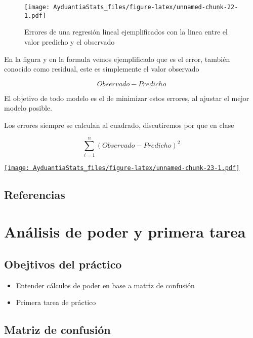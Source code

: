 \documentclass[]{book}
\providecommand{\tightlist}{%
  \setlength{\itemsep}{0pt}\setlength{\parskip}{0pt}}
\begin{document}
\begin{figure}
\centering
\texttt{[image: AyduantiaStats\_files/figure-latex/unnamed-chunk-22-1.pdf]}
\caption{\label{fig:unnamed-chunk-22}Errores de una regresión lineal ejemplificados con la linea entre el valor predicho y el observado}
\end{figure}

En la figura y en la formula vemos ejemplificado que es el error, también conocido como residual, este es simplemente el valor observado

\[Observado - Predicho\]

El objetivo de todo modelo es el de minimizar estos errores, al ajustar el mejor modelo posible.

Los errores siempre se calculan al cuadrado, discutiremos por que en clase

\[\sum_{i=1}^{n} (Observado - Predicho)^2\]

\href{http://admin.derek-corcoran-barrios.com/shiny/rstudio/sample-apps/Shiny1/}{\texttt{[image: AyduantiaStats\_files/figure-latex/unnamed-chunk-23-1.pdf]}}

\hypertarget{referencias}{%
\section{Referencias}\label{referencias}}

\hypertarget{Poder}{%
\chapter{Análisis de poder y primera tarea}\label{Poder}}

\hypertarget{obejtivos-del-practico}{%
\section{Obejtivos del práctico}\label{obejtivos-del-practico}}

\begin{itemize}
\tightlist
\item
  Entender cálculos de poder en base a matriz de confusión
\item
  Primera tarea de práctico
\end{itemize}

\hypertarget{matriz-de-confusion}{%
\section{Matriz de confusión}\label{matriz-de-confusion}}
\end{document}
